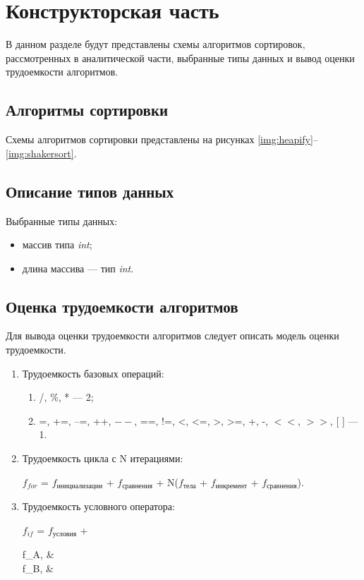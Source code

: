\chapter{Конструкторская часть}
В данном разделе будут представлены схемы алгоритмов сортировок, рассмотренных в аналитической части, выбранные типы данных и вывод оценки трудоемкости алгоритмов.

\section{Алгоритмы сортировки}
Схемы алгоритмов сортировки представлены на рисунках \ref{img:heapify}--\ref{img:shakersort}.

\clearpage


\section{Описание типов данных}
Выбранные типы данных:

\begin{itemize}[label=---]
    \item массив типа \textit{int};
    \item длина массива --- тип \textit{int}. 
\end{itemize}


\section{Оценка трудоемкости алгоритмов}
Для вывода оценки трудоемкости алгоритмов следует описать модель оценки трудоемкости.

\begin{enumerate}
    \item Трудоемкость базовых операций:
    \begin{enumerate}[label=1.\arabic*.]
       \item /, \%, * --- 2;
        \item =, +=, --=, ++, $--$, ==, !=, <, <=, >, >=, +, -, $<<$, $>>$, [ ] --- 1.
    \end{enumerate}
    \item Трудоемкость цикла с N итерациями:
    
        $f_{for}$ = $f_{\text{инициализации}}$ + $f_{\text{сравнения}}$ + N($f_{\text{тела}}$ + $f_{\text{инкремент}}$ + $f_{\text{сравнения}}$).
        
    \item Трудоемкость условного оператора:
    
        $f_{if}$ = $f_{\text{условия}}$ +
		\begin{cases}
			f_A, & \\
			f_B, & 
		\end{cases}
\end{enumerate}

